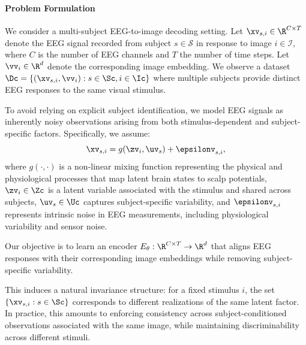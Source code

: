 \documentclass{article}
\begin{document}
\paragraph{Problem Formulation}
We consider a multi-subject EEG-to-image decoding setting. Let $\xv_{s,i} \in \R^{C\times T}$   denote the EEG signal recorded from subject $s \in \mathcal{S}$ in response to image $i \in \mathcal{I}$,  where $C$ is the number of EEG channels and $T$ the number of time steps.  
Let $\vv_i \in \R^{d}$ denote the corresponding image embedding.   
We observe a dataset $\Dc = \{(\xv_{s,i}, \vv_i): s\in \Sc, i \in \Ic\}$ where multiple subjects provide distinct EEG responses to the same visual stimulus.

To avoid relying on explicit subject identification, we model EEG signals as inherently noisy observations arising from both stimulus-dependent and subject-specific factors. Specifically, we assume:
\begin{equation} \label{eq:genmodel}
  \xv_{s,i} = g(\zv_i, \uv_s) + \epsilonv_{s,i}, %
\end{equation}
 where $g(\cdot, \cdot)$ is a non-linear mixing function representing the physical and physiological processes that map latent brain states to scalp potentials, $\zv_i \in \Zc$ is a latent variable associated with the stimulus and shared across subjects, $\uv_s \in \Uc$ captures subject-specific variability, and $\epsilonv_{s,i}$ represents intrinsic noise in EEG measurements, including physiological variability and sensor noise.

Our objective is to learn an encoder $E_\theta : \R^{C \times T} \to \R^d$ that aligns EEG responses with their corresponding image embeddings while removing subject-specific variability. 

This induces a natural invariance structure: for a fixed stimulus $i$, the set $\{ \xv_{s,i} : s \in \Sc \}$ corresponds to different realizations of the same latent factor. 
In practice, this amounts to enforcing consistency across subject-conditioned observations associated with the same image, while maintaining discriminability across different stimuli.
\end{document}
